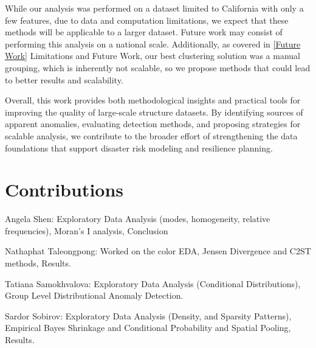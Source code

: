 \documentclass[11pt,letterpaper]{article}
\begin{document}
While our analysis was performed on a dataset limited to California with only a few features, due to data and computation limitations, we expect that these methods will be applicable to a larger dataset. Future work may consist of performing this analysis on a national scale. Additionally, as covered in \ref{Future Work} Limitations and Future Work, our best clustering solution was a manual grouping, which is inherently not scalable, so we propose methods that could lead to better results and scalability.

Overall, this work provides both methodological insights and practical tools for improving the quality of large-scale structure datasets. By identifying sources of apparent anomalies, evaluating detection methods, and proposing strategies for scalable analysis, we contribute to the broader effort of strengthening the data foundations that support disaster risk modeling and resilience planning.

\newpage 

\section{Contributions}

Angela Shen: Exploratory Data Analysis (modes, homogeneity, relative frequencies), Moran's I analysis, Conclusion 

Nathaphat Taleongpong: Worked on the color EDA, Jensen Divergence and C2ST methods, Results.

Tatiana Samokhvalova: Exploratory Data Analysis (Conditional Distributions), Group Level Distributional Anomaly Detection.

Sardor Sobirov: Exploratory Data Analysis (Density, and Sparsity Patterns), Empirical Bayes Shrinkage and Conditional Probability and Spatial Pooling, Results.



\makereference






\clearpage
\end{document}
